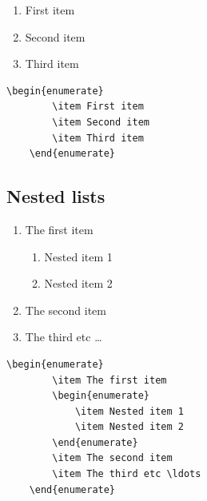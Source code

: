 \begin{enumerate}
	\item First item
	\item Second item
	\item Third item
\end{enumerate}

\begin{mdframed}
	\begin{lstlisting}[language = Tex, caption={Example of an enumerated structure}, label={lst:TestListings}, linewidth = 150mm]
	\begin{enumerate}
		\item First item
		\item Second item
		\item Third item
	\end{enumerate}
	\end{lstlisting}
\end{mdframed}

\subsection{Nested lists}

\begin{enumerate}
	\item The first item
	\begin{enumerate}
		\item Nested item 1
		\item Nested item 2
	\end{enumerate}
	\item The second item
	\item The third etc \ldots
\end{enumerate}

\begin{mdframed}
	\begin{lstlisting}[language = Tex, caption={Example of a nested list structure}, linewidth = 150mm]
	\begin{enumerate}
		\item The first item
		\begin{enumerate}
			\item Nested item 1
			\item Nested item 2
		\end{enumerate}
		\item The second item
		\item The third etc \ldots
	\end{enumerate}
	\end{lstlisting}
\end{mdframed}

